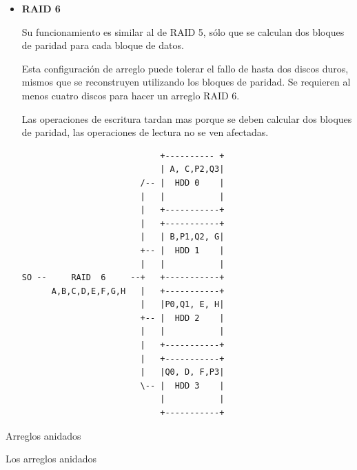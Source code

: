 \begin{itemize}
  \item \textbf{RAID 6}

Su funcionamiento es similar al de RAID 5, s\'{o}lo que se calculan dos bloques de paridad para cada bloque de datos.

Esta configuraci\'{o}n de arreglo puede tolerar el fallo de hasta dos discos duros, mismos que se reconstruyen utilizando los bloques de paridad. Se requieren al menos cuatro discos para hacer un arreglo RAID 6.

Las operaciones de escritura tardan mas porque se deben calcular dos bloques de paridad, las operaciones de lectura no se ven afectadas.
  
{
\scriptsize
\linespread{1}
\begin{verbatim}
                            +---------- +
                            | A, C,P2,Q3|
                        /-- |  HDD 0    |
                        |   |           |
                        |   +-----------+
                        |   +-----------+
                        |   | B,P1,Q2, G|
                        +-- |  HDD 1    |
                        |   |           |
SO --     RAID  6     --+   +-----------+
      A,B,C,D,E,F,G,H   |   +-----------+
                        |   |P0,Q1, E, H|
                        +-- |  HDD 2    |
                        |   |           |
                        |   +-----------+
                        |   +-----------+
                        |   |Q0, D, F,P3|
                        \-- |  HDD 3    |
                            |           |
                            +-----------+
\end{verbatim}
}
  
\end{itemize}

Arreglos anidados

Los arreglos anidados \cite{3e1f0dad689a7971f226a3ded845ae63}

